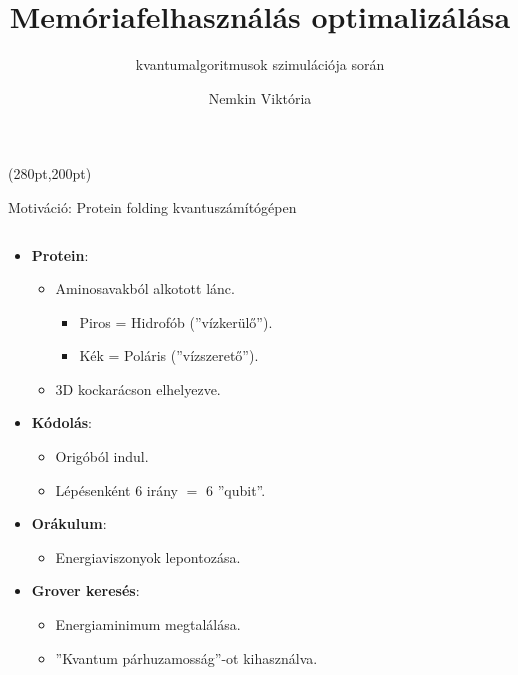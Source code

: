 \documentclass[aspectratio=169]{beamer}
\author[Nemkin Viktória]{Nemkin Viktória}
\institute[]{
\begin{small}dr. Friedl Katalin\end{small}\\
\begin{footnotesize}Számítástudományi és Információelméleti Tanszék\end{footnotesize}
}
\title{Memóriafelhasználás optimalizálása}
\subtitle{kvantumalgoritmusok szimulációja során}
\date{}
\begin{document}
\begin{frame}
\titlepage

\begin{textblock*}{150pt}(280pt,200pt) %

\end{textblock*}
\end{frame}


\begin{frame}{Motiváció: Protein folding kvantuszámítógépen}
\begin{columns}
\begin{column}{0.45\textwidth}
\begin{itemize}
    \item \textbf{Protein}:
    \begin{itemize}
        \item Aminosavakból alkotott lánc.
        \begin{itemize}
          \item \color{red} Piros = Hidrofób (''vízkerülő'').
          \item \color{blue} Kék = Poláris (''vízszerető'').
        \end{itemize}
        \item 3D kockarácson elhelyezve.
    \end{itemize}
    \item \textbf{Kódolás}:
    \begin{itemize}
        \item Origóból indul.
        \item Lépésenként $6$ irány $=$ $6$ ''qubit''.
    \end{itemize}
    \item \textbf{Orákulum}: 
    \begin{itemize}
        \item Energiaviszonyok lepontozása.
    \end{itemize}
    \item \textbf{Grover keresés}:
    \begin{itemize}
        \item Energiaminimum megtalálása.
        \item ''Kvantum párhuzamosság''-ot kihasználva.
    \end{itemize}
\end{itemize}
\end{column}
\begin{column}{0.55\textwidth}
\begin{figure}[H]

\end{figure}
\end{column}
\end{columns}
\end{frame}
\end{document}
